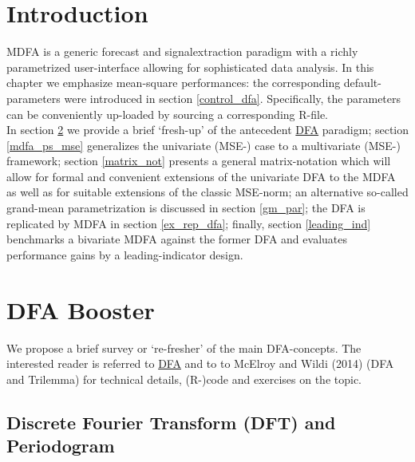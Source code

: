 \documentclass[a4paper]{book}
\begin{document}
\section{Introduction}

MDFA is a generic forecast and signalextraction paradigm with a richly parametrized user-interface allowing for sophisticated data analysis. In this chapter we emphasize mean-square performances: the corresponding default-parameters were introduced in section \ref{control_dfa}. Specifically, the parameters can be conveniently up-loaded by sourcing a corresponding R-file. \\

In section \ref{fresh_up} we provide a brief `fresh-up' of the antecedent \href{http://blog.zhaw.ch/sef/files/2014/10/DFA.pdf}{DFA} paradigm; section \ref{mdfa_ps_mse} generalizes the univariate (MSE-) case to a multivariate (MSE-) framework; section \ref{matrix_not} presents a general matrix-notation which will allow for formal and convenient extensions of the univariate DFA to the MDFA as well as for suitable extensions of the classic MSE-norm; an alternative so-called grand-mean parametrization is discussed in section \ref{gm_par}; the DFA is replicated by MDFA in section \ref{ex_rep_dfa}; finally, section \ref{leading_ind} benchmarks a bivariate MDFA against the former DFA and evaluates performance gains by a leading-indicator design.

\section{DFA Booster}\label{fresh_up}

We propose a brief survey or `re-fresher' of the main DFA-concepts. The interested reader is referred  to \href{http://blog.zhaw.ch/sef/files/2014/10/DFA.pdf}{DFA} and to to McElroy and Wildi (2014) (DFA and Trilemma) for technical details, (R-)code and exercises on the topic.



\subsection{Discrete Fourier Transform (DFT) and Periodogram}\label{dft_and_per}
\end{document}
